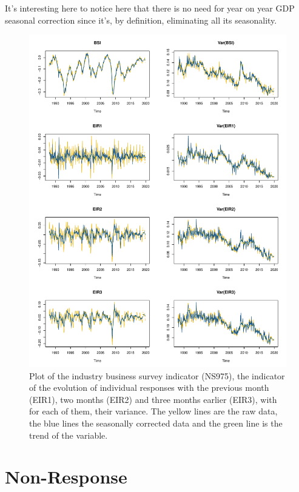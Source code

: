 \documentclass[12pt,a4paper,oneside]{book}
\begin{document}
It's interesting here to notice here that there is no need for year on year GDP seasonal correction since it's, by definition, eliminating all its seasonality.

\begin{figure}[htp!]
    \centering
    \includegraphics[scale=0.75]{Graphs/RJDemetra_plots.pdf}
    \caption{Plot of the industry business survey indicator (NS975), the indicator of the evolution of individual responses with the previous month (EIR1), two months (EIR2) and three months earlier (EIR3), with for each of them, their variance. The yellow lines are the raw data, the blue lines the seasonally corrected data and the green line is the trend of the variable.}
    \label{fig:seasonal ajusted rjdemetra}
\end{figure}


\section{Non-Response}
\end{document}
